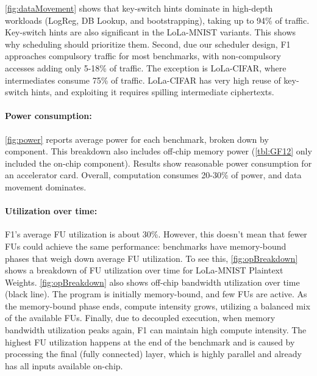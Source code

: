 \autoref{fig:dataMovement} shows that key-switch hints dominate in high-depth workloads
(LogReg, DB Lookup, and bootstrapping), taking up to 94\% of traffic.
Key-switch hints are also significant in the LoLa-MNIST variants.
This shows why scheduling should prioritize them.
Second, due our scheduler design, F1 approaches compulsory
traffic for most benchmarks, with non\hyp{}compulsory accesses
adding only 5-18\% of traffic.
The exception is LoLa-CIFAR, where intermediates consume 75\% of traffic.
LoLa-CIFAR has very high reuse of key-switch hints,
and exploiting it requires spilling intermediate ciphertexts.

\figDataMovement
\figOpBreakdown

\paragraph{Power consumption:}
\autoref{fig:power} reports average power for each benchmark, broken down by component.
This breakdown also includes off-chip memory power (\autoref{tbl:GF12} only included the on-chip component).
Results show reasonable power consumption for an accelerator card.
Overall, computation consumes 20-30\% of power, and data movement dominates.

\paragraph{Utilization over time:}
F1's average FU utilization is about 30\%.
However, this doesn't mean that fewer FUs could achieve the same performance:
benchmarks have memory\hyp{}bound phases 
that weigh down average FU utilization.
To see this, \autoref{fig:opBreakdown} shows a breakdown of FU utilization over 
time for LoLa-MNIST Plaintext Weights.
\autoref{fig:opBreakdown} also shows off-chip bandwidth utilization over time (black line).
The program is initially memory-bound, and few FUs are active.
As the memory-bound phase ends, compute intensity grows, 
utilizing a balanced mix of the available FUs.
Finally, due to decoupled execution,
when memory bandwidth utilization peaks again,
F1 can maintain high compute intensity.
The highest FU utilization happens at the end of the benchmark and is caused by processing
the final (fully connected) layer, which is highly parallel and already has all inputs available on-chip.


